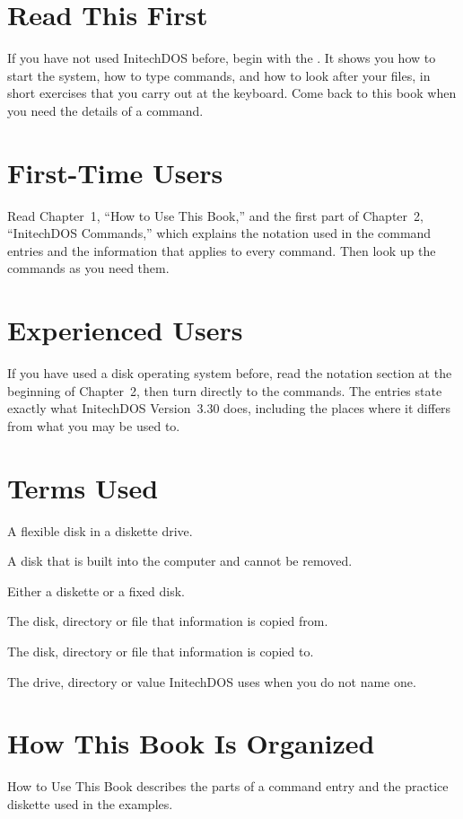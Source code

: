 \section{Read This First}
If you have not used InitechDOS before, begin with the .  It shows you how to start the system, how to type commands,
and how to look after your files, in short exercises that you carry out at
the keyboard.  Come back to this book when you need the details of a
command.

\section{First-Time Users}
Read Chapter~1, ``How to Use This Book,'' and the first part of Chapter~2,
``InitechDOS Commands,'' which explains the notation used in the command
entries and the information that applies to every command.  Then look up
the commands as you need them.

\section{Experienced Users}
If you have used a disk operating system before, read the notation section
at the beginning of Chapter~2, then turn directly to the commands.  The
entries state exactly what InitechDOS Version~3.30 does, including the
places where it differs from what you may be used to.

\section{Terms Used}
A flexible disk in a diskette drive.

A disk that is built into the computer and cannot be
removed.

Either a diskette or a fixed disk.

The disk, directory or file that information is copied
from.

The disk, directory or file that information is copied
to.

The drive, directory or value InitechDOS uses when you do
not name one.

\section{How This Book Is Organized}
How to Use This Book describes the parts of a command
entry and the practice diskette used in the examples.

